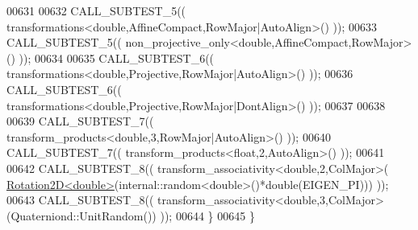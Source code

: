 \begin{DoxyCode}
00631     
00632     CALL\_SUBTEST\_5(( transformations<double,AffineCompact,RowMajor|AutoAlign>() ));
00633     CALL\_SUBTEST\_5(( non\_projective\_only<double,AffineCompact,RowMajor>() ));
00634 
00635     CALL\_SUBTEST\_6(( transformations<double,Projective,RowMajor|AutoAlign>() ));
00636     CALL\_SUBTEST\_6(( transformations<double,Projective,RowMajor|DontAlign>() ));
00637 
00638 
00639     CALL\_SUBTEST\_7(( transform\_products<double,3,RowMajor|AutoAlign>() ));
00640     CALL\_SUBTEST\_7(( transform\_products<float,2,AutoAlign>() ));
00641 
00642     CALL\_SUBTEST\_8(( transform\_associativity<double,2,ColMajor>(
      \hyperlink{group___geometry___module_class_eigen_1_1_rotation2_d}{Rotation2D<double>}(internal::random<double>()*\textcolor{keywordtype}{double}(EIGEN\_PI))) ));
00643     CALL\_SUBTEST\_8(( transform\_associativity<double,3,ColMajor>(Quaterniond::UnitRandom()) ));
00644   \}
00645 \}
\end{DoxyCode}

